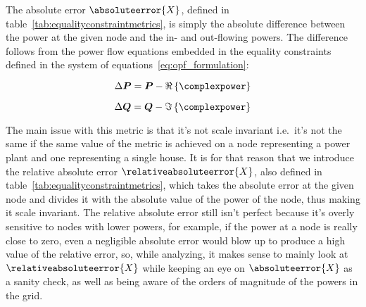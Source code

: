 The absolute error $\absoluteerror{X}$, defined in table~\ref{tab:equalityconstraintmetrics},
is simply the absolute difference between the power at the given node and
the in- and out-flowing powers.
The difference follows from the power flow equations embedded in the equality
constraints defined in the system of equations~\ref{eq:opf_formulation}:

\begin{equation}
    \label{eq:active_power_error}
    \Delta \boldsymbol{P} = \boldsymbol{P} - \Re\left\{ \complexpower \right\}
\end{equation}

\begin{equation}
    \label{eq:reactive_power_error}
    \Delta \boldsymbol{Q} = \boldsymbol{Q} - \Im\left\{ \complexpower \right\}
\end{equation}

The main issue with this metric is that it's not scale invariant i.e.\
it's not the same if the same value of the metric is achieved on a
node representing a power plant and one representing a single house.
It is for that reason that we introduce the relative absolute error
$\relativeabsoluteerror{X}$, also defined in table~\ref{tab:equalityconstraintmetrics},
which takes the absolute error at the given node and divides it with
the absolute value of the power of the node, thus making it scale
invariant.
The relative absolute error still isn't perfect because it's
overly sensitive to nodes with lower powers, for example,
if the power at a node is really close to zero, even a
negligible absolute error would blow up to produce a high
value of the relative error, so, while analyzing, it makes sense to mainly
look at $\relativeabsoluteerror{X}$ while keeping an eye on
$\absoluteerror{X}$ as a sanity check, as well as being aware of the
orders of magnitude of the powers in the grid.